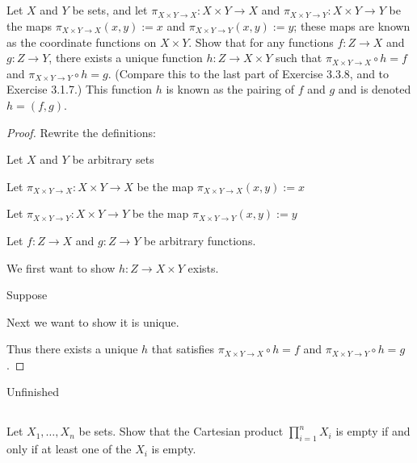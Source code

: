 \documentclass[../../main.tex]{subfiles}
\begin{document}
\addtocounter{subsection}{2}
\subsection{}
\begin{q}
    Let $X$ and $Y$ be sets, and let $\pi_{X\times Y\to X} : X \times Y \to X$ and $\pi_{X\times Y\to Y} : X \times Y \to Y$ be the maps $\pi_{X\times Y\to X}(x, y) := x$ and $\pi_{X\times Y\to Y}(x, y) := y$; these maps are known as the coordinate functions on $X\times Y$. Show that for any functions $f : Z \to X$ and $g : Z \to Y$, there exists a unique function $h : Z \to X \times Y$ such that $\pi_{X\times Y\to X} \circ h = f$ and $\pi_{X\times Y\to Y} \circ h = g$. (Compare this to the last part of Exercise 3.3.8, and to Exercise 3.1.7.) This function $h$ is known as the pairing of $f$ and $g$ and is denoted $h = (f, g)$.
\end{q}

\begin{proof}
    Rewrite the definitions:
    \begin{linebyline}
        \item Let $X$ and $Y$ be arbitrary sets
        \item Let $\pi_{X\times Y\to X} : X \times Y \to X$ be the map $\pi_{X\times Y\to X}(x, y) := x$
        \item Let $\pi_{X\times Y\to Y} : X \times Y \to Y$ be the map $\pi_{X\times Y\to Y}(x, y) := y$
        \item Let $f : Z \to X$ and $g : Z \to Y$ be arbitrary functions.
    \end{linebyline}
    We first want to show $h : Z \to X \times Y$ exists.
    \begin{linebyline}[resume]
        \item Suppose 
    \end{linebyline}
    Next we want to show it is unique.
    \begin{linebyline}[resume]
        \item
    \end{linebyline}
    Thus there exists a unique $h$ that satisfies $\pi_{X\times Y\to X} \circ h = f$ and $\pi_{X\times Y\to Y} \circ h = g$.
\end{proof}
\begin{xx}
    Unfinished
\end{xx}

\subsection{}
\begin{q}
    Let $X_1, \ldots, X_n$ be sets. Show that the Cartesian product $\prod_{i=1}^n X_i$ is empty if and only if at least one of the $X_i$ is empty.
\end{q}
\end{document}
